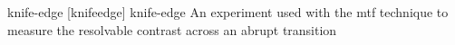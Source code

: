 \newglsXterm%
{knife-edge}%
[knifeedge]%
{knife{\--}edge}%
{An experiment used with the \gls{mtf} technique to measure the resolvable contrast across an abrupt transition}%